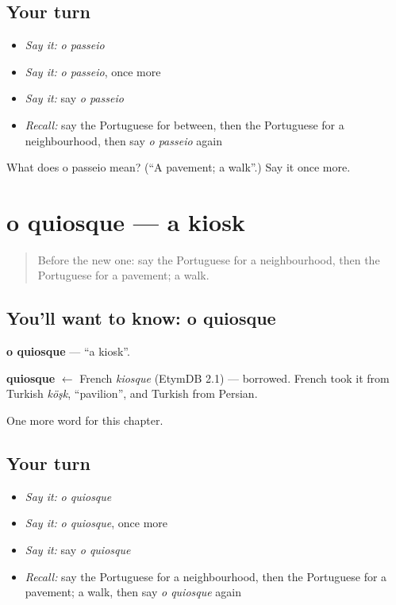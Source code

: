 \subsection*{Your turn}
\begin{itemize}
\raggedright
  \item \emph{Say it:} \emph{o passeio}
  \item \emph{Say it:} \emph{o passeio}, once more
  \item \emph{Say it:} say \emph{o passeio}
  \item \emph{Recall:} say the Portuguese for between, then the Portuguese for a neighbourhood, then say \emph{o passeio} again
\end{itemize}

\begin{tcolorbox}[breakable,colback=teal!4,colframe=teal!35!black,title={Before you move on}]
What does o passeio mean? (\textquotedblleft{}A pavement; a walk\textquotedblright{}.) Say it once more.
\end{tcolorbox}
\section[o quiosque]{o quiosque — a kiosk}

\label{lesson:PT-C90-quiosque}



\begin{quote}
Before the new one: say the Portuguese for a neighbourhood, then the Portuguese for a pavement; a walk.
\end{quote}

\subsection*{You'll want to know: o quiosque}
\textbf{o quiosque} — \textquotedblleft{}a kiosk\textquotedblright{}.

\begin{cousinweb}
\textbf{quiosque} $\leftarrow$ French \emph{kiosque} (EtymDB 2.1) — borrowed. French took it from Turkish \emph{köşk}, \textquotedblleft{}pavilion\textquotedblright{}, and Turkish from Persian.
\end{cousinweb}

\begin{grammarlens}[title={What you've built}]
One more word for this chapter.
\end{grammarlens}

\subsection*{Your turn}
\begin{itemize}
\raggedright
  \item \emph{Say it:} \emph{o quiosque}
  \item \emph{Say it:} \emph{o quiosque}, once more
  \item \emph{Say it:} say \emph{o quiosque}
  \item \emph{Recall:} say the Portuguese for a neighbourhood, then the Portuguese for a pavement; a walk, then say \emph{o quiosque} again
\end{itemize}

